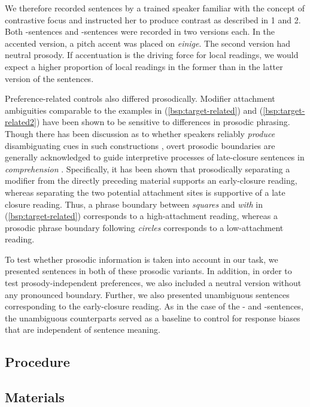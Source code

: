 \documentclass[fleqn,reqno,10pt,draft]{article}
\newcommand{\as}{\acro{as}}
\renewcommand{\es}{\acro{es}}
\begin{document}
\noindent We therefore recorded sentences by a trained speaker
familiar with the concept of contrastive focus and instructed her to
produce contrast as described in 1 and 2. Both \as-sentences and
\es-sentences were recorded in two versions each. In the accented
version, a pitch accent was placed on {\it einige}. The second version
had neutral prosody.  If accentuation is the driving force for local
readings, we would expect a higher proportion of local readings in the
former than in the latter version of the sentences.

Preference-related controls also differed prosodically. Modifier
attachment ambiguities comparable to the examples in
(\ref{bsp:target-related}) and (\ref{bsp:target-related2}) have been
shown to be sensitive to differences in prosodic phrasing. Though
there has been discussion as to whether speakers reliably
\textit{produce} disambiguating cues in such constructions
\citep[e.g.][]{Allbritton96,Kraljik05, Snedeker03, Schafer00}, overt
prosodic boundaries are generally acknowledged to guide interpretive
processes of late-closure sentences in \textit{comprehension}
\citep[e.g.][]{Steinhauer99, Augurzky06}.  Specifically, it has been
shown that prosodically separating a modifier from the directly
preceding material supports an early-closure reading, whereas
separating the two potential attachment sites is supportive of a late
closure reading. Thus, a phrase boundary between {\it squares} and
{\it with} in (\ref{bsp:target-related}) corresponds to a
high-attachment reading, whereas a prosodic phrase boundary following
{\it circles} corresponds to a low-attachment reading.

To test whether prosodic information is taken into account in our
task, we presented sentences in both of these prosodic variants. In
addition, in order to test prosody-independent preferences, we also
included a neutral version without any pronounced boundary. Further,
we also presented unambiguous sentences corresponding to the
early-closure reading. As in the case of the \as- and \es-sentences,
the unambiguous counterparts served as a baseline to control for
response biases that are independent of sentence meaning.


\subsection{Procedure}
\label{sec:procedure}   

\subsection{Materials}
\label{sec:materials}
\end{document}
